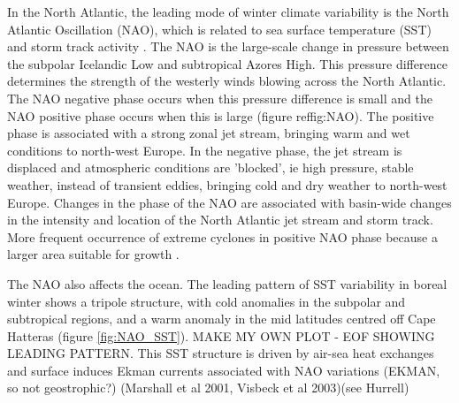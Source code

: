 In the North Atlantic, the leading mode of winter climate variability is the North Atlantic Oscillation (NAO), which is related to sea surface temperature (SST) and storm track activity \citep{vallis2008local}. The NAO is the large-scale change in pressure between the subpolar Icelandic Low and subtropical Azores High. This pressure difference determines the strength of the westerly winds blowing across the North Atlantic. The NAO negative phase occurs when this pressure difference is small and the NAO positive phase occurs when this is large (figure ref{fig:NAO}). The positive phase is associated with a strong zonal jet stream, bringing warm and wet conditions to north-west Europe. In the negative phase, the jet stream is displaced and atmospheric conditions are 'blocked', ie high pressure, stable weather, instead of transient eddies, bringing cold and dry weather to north-west Europe. Changes in the phase of the NAO are associated with basin-wide changes in the intensity and location of the North Atlantic jet stream and storm track. More frequent occurrence of extreme cyclones in positive NAO phase because a larger area suitable for growth \citet{pinto2009factors}.

The NAO also affects the ocean. The leading pattern of SST variability in boreal winter shows a tripole structure, with cold anomalies in the subpolar and subtropical regions, and a warm anomaly in the mid latitudes centred off Cape Hatteras (figure \ref{fig:NAO_SST}). MAKE MY OWN PLOT - EOF SHOWING LEADING PATTERN. This SST structure is driven by air-sea heat exchanges and surface induces Ekman currents associated with NAO variations (EKMAN, so not geostrophic?) (Marshall et al 2001, Visbeck et al 2003)(see Hurrell)

